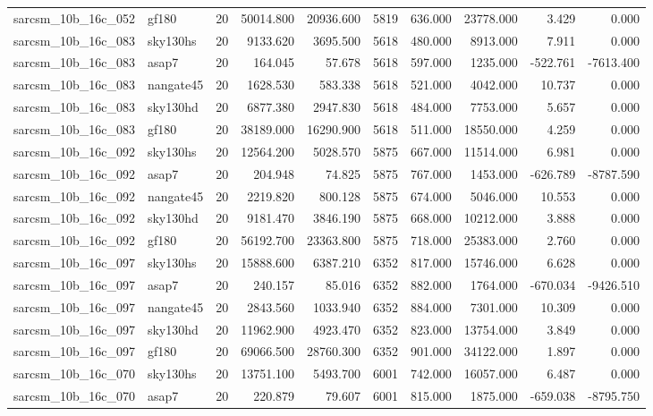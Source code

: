 \documentclass{article}
\begin{document}
\begin{longtable}{llrrrrrrrr}
sarcsm\_10b\_16c\_052 & gf180 & 20 & 50014.800 & 20936.600 & 5819 & 636.000 & 23778.000 & 3.429 & 0.000 \\
sarcsm\_10b\_16c\_083 & sky130hs & 20 & 9133.620 & 3695.500 & 5618 & 480.000 & 8913.000 & 7.911 & 0.000 \\
sarcsm\_10b\_16c\_083 & asap7 & 20 & 164.045 & 57.678 & 5618 & 597.000 & 1235.000 & -522.761 & -7613.400 \\
sarcsm\_10b\_16c\_083 & nangate45 & 20 & 1628.530 & 583.338 & 5618 & 521.000 & 4042.000 & 10.737 & 0.000 \\
sarcsm\_10b\_16c\_083 & sky130hd & 20 & 6877.380 & 2947.830 & 5618 & 484.000 & 7753.000 & 5.657 & 0.000 \\
sarcsm\_10b\_16c\_083 & gf180 & 20 & 38189.000 & 16290.900 & 5618 & 511.000 & 18550.000 & 4.259 & 0.000 \\
sarcsm\_10b\_16c\_092 & sky130hs & 20 & 12564.200 & 5028.570 & 5875 & 667.000 & 11514.000 & 6.981 & 0.000 \\
sarcsm\_10b\_16c\_092 & asap7 & 20 & 204.948 & 74.825 & 5875 & 767.000 & 1453.000 & -626.789 & -8787.590 \\
sarcsm\_10b\_16c\_092 & nangate45 & 20 & 2219.820 & 800.128 & 5875 & 674.000 & 5046.000 & 10.553 & 0.000 \\
sarcsm\_10b\_16c\_092 & sky130hd & 20 & 9181.470 & 3846.190 & 5875 & 668.000 & 10212.000 & 3.888 & 0.000 \\
sarcsm\_10b\_16c\_092 & gf180 & 20 & 56192.700 & 23363.800 & 5875 & 718.000 & 25383.000 & 2.760 & 0.000 \\
sarcsm\_10b\_16c\_097 & sky130hs & 20 & 15888.600 & 6387.210 & 6352 & 817.000 & 15746.000 & 6.628 & 0.000 \\
sarcsm\_10b\_16c\_097 & asap7 & 20 & 240.157 & 85.016 & 6352 & 882.000 & 1764.000 & -670.034 & -9426.510 \\
sarcsm\_10b\_16c\_097 & nangate45 & 20 & 2843.560 & 1033.940 & 6352 & 884.000 & 7301.000 & 10.309 & 0.000 \\
sarcsm\_10b\_16c\_097 & sky130hd & 20 & 11962.900 & 4923.470 & 6352 & 823.000 & 13754.000 & 3.849 & 0.000 \\
sarcsm\_10b\_16c\_097 & gf180 & 20 & 69066.500 & 28760.300 & 6352 & 901.000 & 34122.000 & 1.897 & 0.000 \\
sarcsm\_10b\_16c\_070 & sky130hs & 20 & 13751.100 & 5493.700 & 6001 & 742.000 & 16057.000 & 6.487 & 0.000 \\
sarcsm\_10b\_16c\_070 & asap7 & 20 & 220.879 & 79.607 & 6001 & 815.000 & 1875.000 & -659.038 & -8795.750 \\

\end{longtable}
\end{document}
